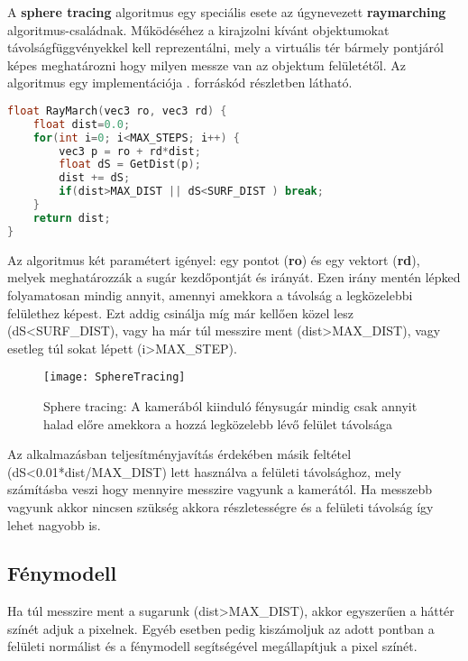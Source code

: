 A \textbf{sphere tracing} algoritmus egy speciális esete az úgynevezett \textbf{raymarching} algoritmus-családnak. Működéséhez a kirajzolni kívánt objektumokat távolságfüggvényekkel kell reprezentálni, mely a virtuális tér bármely pontjáról képes meghatározni hogy milyen messze van az objektum felületétől. Az algoritmus egy implementációja . forráskód részletben látható.

\begin{lstlisting}[language={C}]
float RayMarch(vec3 ro, vec3 rd) {
	float dist=0.0;    
    for(int i=0; i<MAX_STEPS; i++) {
        vec3 p = ro + rd*dist;
        float dS = GetDist(p);
        dist += dS;
        if(dist>MAX_DIST || dS<SURF_DIST ) break;
    }    
    return dist;
}
\end{lstlisting}

Az algoritmus két paramétert igényel: egy pontot (\textbf{ro}) és egy vektort (\textbf{rd}), melyek meghatározzák a sugár kezdőpontját és irányát. Ezen irány mentén lépked folyamatosan mindig annyit, amennyi amekkora a távolság a legközelebbi felülethez képest. Ezt addig csinálja míg már kellően közel lesz (dS<SURF\_DIST), vagy ha már túl messzire ment (dist>MAX\_DIST), vagy esetleg túl sokat lépett (i>MAX\_STEP). 


\begin{figure}[H]
	\centering
	\texttt{[image: SphereTracing]}
	\caption{Sphere tracing: A kamerából kiinduló fénysugár mindig csak annyit halad előre amekkora a hozzá legközelebb lévő felület távolsága \cite{Raymarch94:online}}
	\label{fig:SphereTracing2}
\end{figure}

Az alkalmazásban teljesítményjavítás érdekében másik feltétel (dS<0.01*dist/MAX\_DIST) lett használva a felületi távolsághoz, mely számításba veszi hogy mennyire messzire vagyunk a kamerától. Ha messzebb vagyunk akkor nincsen szükség akkora részletességre és a felületi távolság így lehet nagyobb is.

\subsection{Fénymodell}
\label{sec:lighting}
Ha túl messzire ment a sugarunk (dist>MAX\_DIST), akkor egyszerűen a háttér színét adjuk a pixelnek. Egyéb esetben pedig kiszámoljuk az adott pontban a felületi normálist és a fénymodell segítségével megállapítjuk a pixel színét.

